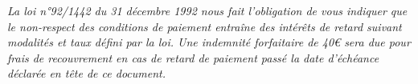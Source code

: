 \documentclass[11pt,a4paper]{article}
\begin{document}
\vspace{1cm}
\textit{\footnotesize La loi n°92/1442 du 31 décembre 1992 nous fait l'obligation de vous indiquer que le non-respect des conditions de paiement entraîne des intérêts de retard suivant modalités et taux défini par la loi. Une indemnité forfaitaire de 40€ sera due pour frais de recouvrement en cas de retard de paiement passé la date d'échéance déclarée en tête de ce document.}
\end{document}
